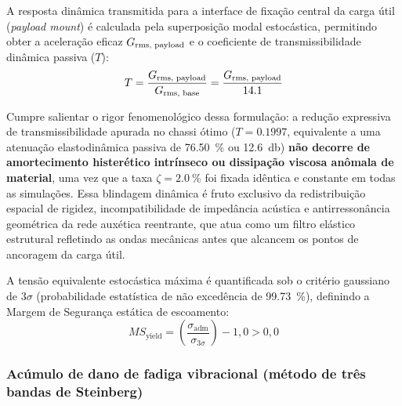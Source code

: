 A resposta dinâmica transmitida para a interface de fixação central da carga útil (\textit{payload mount}) é calculada pela superposição modal estocástica, permitindo obter a aceleração eficaz $G_{\text{rms, payload}}$ e o coeficiente de transmissibilidade dinâmica passiva ($T$):
\begin{equation}
  T = \frac{G_{\text{rms, payload}}}{G_{\text{rms, base}}} = \frac{G_{\text{rms, payload}}}{\num{14.1}}
  \label{eq:transmissibilidade}
\end{equation}

Cumpre salientar o rigor fenomenológico dessa formulação: a redução expressiva de transmissibilidade apurada no chassi ótimo ($T = \num{0.1997}$, equivalente a uma atenuação elastodinâmica passiva de \SI{76.50}{\percent} ou \SI{12.6}{\decibel}) \textbf{não decorre de amortecimento histerético intrínseco ou dissipação viscosa anômala de material}, uma vez que a taxa $\zeta = \SI{2.0}{\percent}$ foi fixada idêntica e constante em todas as simulações. Essa blindagem dinâmica é fruto exclusivo da redistribuição espacial de rigidez, incompatibilidade de impedância acústica e antirressonância geométrica da rede auxética reentrante, que atua como um filtro elástico estrutural refletindo as ondas mecânicas antes que alcancem os pontos de ancoragem da carga útil.

A tensão equivalente estocástica máxima é quantificada sob o critério gaussiano de $3\sigma$ (probabilidade estatística de não excedência de \SI{99.73}{\percent}), definindo a Margem de Segurança estática de escoamento:
\begin{equation}
  MS_{\text{yield}} = \left( \frac{\sigma_{\text{adm}}}{\sigma_{3\sigma}} \right) - 1{,}0 > 0{,}0
  \label{eq:ms}
\end{equation}

\subsubsection{Acúmulo de dano de fadiga vibracional (método de três bandas de Steinberg)}
\label{subsubsec:steinberg}


